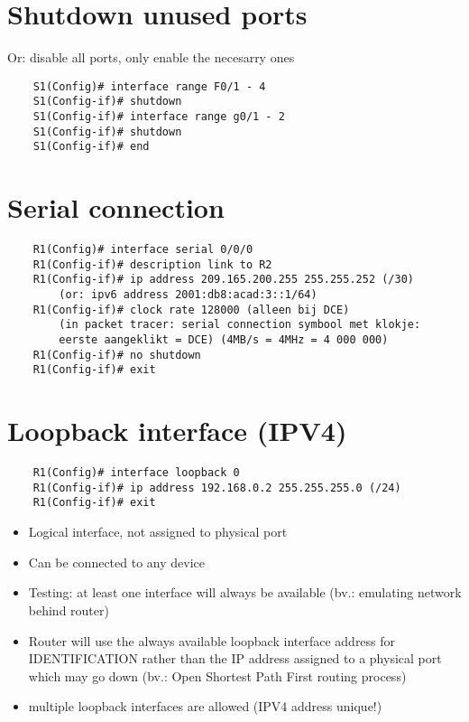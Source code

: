 \documentclass[10pt, a4paper]{article}
\begin{document}
	\section{Shutdown unused ports}
	Or: disable all ports, only enable the necesarry ones\\
	\begin{lstlisting}
	S1(Config)# interface range F0/1 - 4
	S1(Config-if)# shutdown
	S1(Config-if)# interface range g0/1 - 2
	S1(Config-if)# shutdown
	S1(Config-if)# end
	\end{lstlisting}

	\section{Serial connection}
	\begin{lstlisting}
	R1(Config)# interface serial 0/0/0
	R1(Config-if)# description link to R2
	R1(Config-if)# ip address 209.165.200.255 255.255.252 (/30)
		(or: ipv6 address 2001:db8:acad:3::1/64)
	R1(Config-if)# clock rate 128000 (alleen bij DCE)
		(in packet tracer: serial connection symbool met klokje:
		eerste aangeklikt = DCE) (4MB/s = 4MHz = 4 000 000)
	R1(Config-if)# no shutdown
	R1(Config-if)# exit
	\end{lstlisting}

	\section{Loopback interface (IPV4)}
	\begin{lstlisting}
	R1(Config)# interface loopback 0
	R1(Config-if)# ip address 192.168.0.2 255.255.255.0 (/24)
	R1(Config-if)# exit
	\end{lstlisting}

	\begin{itemize}[noitemsep,nolistsep]
		\item Logical interface, not assigned to physical port
		\item Can be connected to any device
		\item Testing: at least one interface will always be available (bv.: emulating network behind router)
		\item Router will use the always available loopback interface address for IDENTIFICATION rather than the IP address assigned to a physical port which may go down (bv.: Open Shortest Path First routing process)
		\item multiple loopback interfaces are allowed (IPV4 address unique!)\\
	\end{itemize}
\end{document}
